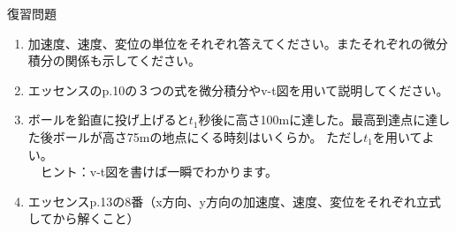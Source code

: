 \documentclass[12pt,a4paper]{jsarticle}
\begin{document}
復習問題
\begin{enumerate}
    \item 加速度、速度、変位の単位をそれぞれ答えてください。またそれぞれの微分積分の関係も示してください。
    \item エッセンスのp.10の３つの式を微分積分やv-t図を用いて説明してください。
    \item ボールを鉛直に投げ上げると$t_1$秒後に高さ100mに達した。最高到達点に達した後ボールが高さ75mの地点にくる時刻はいくらか。
    ただし$t_1$を用いてよい。
    \\　ヒント：v-t図を書けば一瞬でわかります。
    \item エッセンスp.13の8番（x方向、y方向の加速度、速度、変位をそれぞれ立式してから解くこと）
\end{enumerate}
\end{document}
